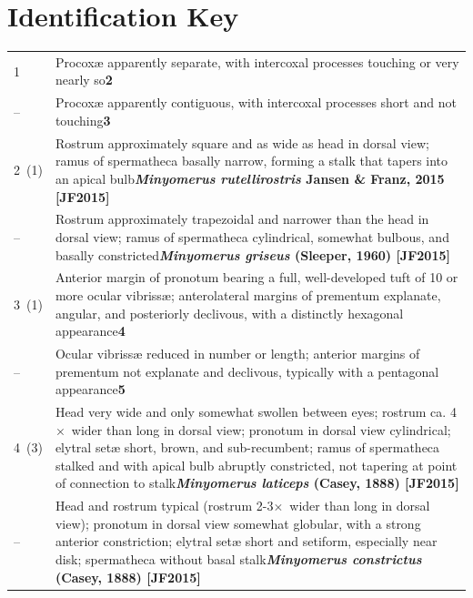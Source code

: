 \documentclass[fleqn,10pt,lineno]{wlpeerj} %
\newcommand{\x}{$\times$~}
\newcommand{\breakfill}{\dotfill\newline\penalty0\hbox{}\nobreak\dotfill}
\begin{document}
\section*{Identification Key}\label{sec:idkey}
	\begin{xtabular}{@{}
                p{\dimexpr.1\textwidth-\tabcolsep\relax}
                p{\dimexpr.9\textwidth-\tabcolsep\relax}@{}}
                
		{1} & {Procox{\ae} apparently separate, with intercoxal processes touching or very nearly so}{\dotfill}{\textbf{2}}\\
		{--} & {Procox{\ae} apparently contiguous, with intercoxal processes short and not touching}{\dotfill}{\textbf{3}}\\
		
		{2~(1)} & {Rostrum approximately square and as wide as head in dorsal view; ramus of spermatheca basally narrow, forming a stalk that tapers into an apical bulb}{\breakfill}{\textbf{\textit{Minyomerus rutellirostris} Jansen \& Franz, 2015 [JF2015]}}\\
		{--} & {Rostrum approximately trapezoidal and narrower than the head in dorsal view; ramus of spermatheca cylindrical, somewhat bulbous, and basally constricted}{\breakfill}{\textbf{\textit{Minyomerus griseus} (Sleeper, 1960) [JF2015]}}\\
		
		{3~(1)} & {Anterior margin of pronotum bearing a full, well-developed tuft of 10 or more ocular vibriss{\ae}; anterolateral margins of prementum explanate, angular, and posteriorly declivous, with a distinctly hexagonal appearance}{\dotfill}{\textbf{4}}\\
		{--} & {Ocular vibriss{\ae} reduced in number or length; anterior margins of prementum not explanate and declivous, typically with a pentagonal appearance}{\dotfill}{\textbf{5}}\\
		
		{4~(3)} & {Head very wide and only somewhat swollen between eyes; rostrum ca. 4\x wider than long in dorsal view; pronotum in dorsal view cylindrical; elytral set{\ae} short, brown, and sub-recumbent; ramus of spermatheca stalked and with apical bulb abruptly constricted, not tapering at point of connection to stalk}{\dotfill}{\textbf{\textit{Minyomerus laticeps} (Casey, 1888) [JF2015]}}\\
		{--} & {Head and rostrum typical (rostrum 2-3\x wider than long in dorsal view); pronotum in dorsal view somewhat globular, with a strong anterior constriction; elytral set{\ae} short and setiform, especially near disk; spermatheca without basal stalk}{\breakfill}{\textbf{\textit{Minyomerus constrictus} (Casey, 1888) [JF2015]}}\\
		

\end{xtabular}
\end{document}
